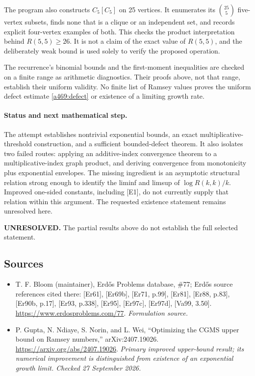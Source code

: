 \documentclass[11pt]{article}
\begin{document}
The program also constructs $C_5[C_5]$ on 25 vertices. It enumerates its $\binom{25}{5}$ five-vertex subsets, finds none that is a clique or an independent set, and records explicit four-vertex examples of both. This checks the product interpretation behind $R(5,5)\geq26$. It is not a claim of the exact value of $R(5,5)$, and the deliberately weak bound is used solely to verify the proposed operation.

The recurrence's binomial bounds and the first-moment inequalities are checked on a finite range as arithmetic diagnostics. Their proofs above, not that range, establish their uniform validity. No finite list of Ramsey values proves the uniform defect estimate \eqref{a469:defect} or existence of a limiting growth rate.

\paragraph{Status and next mathematical step.}
The attempt establishes nontrivial exponential bounds, an exact multiplicative-threshold construction, and a sufficient bounded-defect theorem. It also isolates two failed routes: applying an additive-index convergence theorem to a multiplicative-index graph product, and deriving convergence from monotonicity plus exponential envelopes. The missing ingredient is an asymptotic structural relation strong enough to identify the liminf and limsup of $\log R(k,k)/k$. Improved one-sided constants, including [E1], do not currently supply that relation within this argument. The requested existence statement remains unresolved here.

\textbf{UNRESOLVED.} The partial results above do not establish the full selected statement.

\subsection{Sources}
\begin{itemize}
\item[S1]T. F. Bloom (maintainer), Erdős Problems database, \#77; Erdős source references cited there: [Er61], [Er69b], [Er71, p.99], [Er81], [Er88, p.83], [Er90b, p.17], [Er93, p.338], [Er95], [Er97c], [Er97d], [Va99, 3.50].
\url{https://www.erdosproblems.com/77}.
\textit{Formulation source.}
\item[E1] P. Gupta, N. Ndiaye, S. Norin, and L. Wei, ``Optimizing the CGMS upper bound on Ramsey numbers,'' arXiv:2407.19026.
\url{https://arxiv.org/abs/2407.19026}.
\textit{Primary improved upper-bound result; its numerical improvement is distinguished from existence of an exponential growth limit. Checked 27 September 2026.}
\end{itemize}
\end{document}
